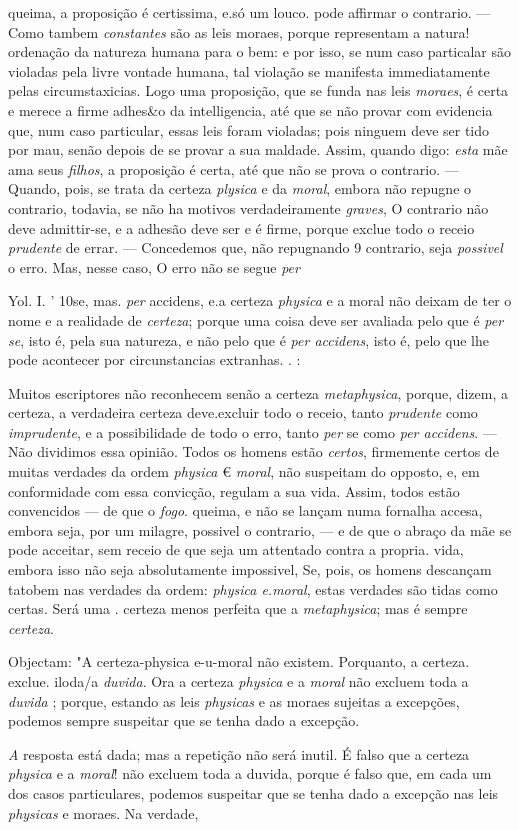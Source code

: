queima, a proposição é certissima, e.só um louco. pode affirmar o contrario. --- Como tambem \emph{constantes} são as leis moraes, porque representam a natura! ordenação da natureza humana para o bem: e por isso, se num caso particalar são violadas pela livre vontade humana, tal violação se manifesta immediatamente pelas circumstaxicias. Logo uma proposição, que se funda nas leis \emph{moraes}, é certa e merece a firme adhes\&o da intelligencia, até que se não provar com evidencia que, num caso particular, essas leis foram violadas; pois ninguem deve ser tido por mau, senão depois de se provar a sua maldade. Assim, quando digo: \emph{esta} mãe ama seus \emph{filhos}, a proposição é certa, até que não se prova o contrario. --- Quando, pois, se trata da certeza \emph{plysica} e da \emph{moral}, embora não repugne o contrario, todavia, se não ha motivos verdadeiramente \emph{graves}, O contrario não deve admittir-se, e a adhesão deve ser e é firme, porque exclue todo o receio \emph{prudente} de errar. --- Concedemos que, não repugnando 9 contrario, seja \emph{possivel} o erro. Mas, nesse caso, O erro não se segue \emph{per}\par Yol. I. ' 10se, mas. \emph{per} accidens, e.a certeza \emph{physica} e a moral não deixam de ter o nome e a realidade de \emph{certeza}; porque uma coisa deve ser avaliada pelo que é \emph{per se}, isto é, pela sua natureza, e não pelo que é \emph{per accidens}, isto é, pelo que lhe pode acontecer por circunstancias extranhas. . :\par Muitos escriptores não reconhecem senão a certeza \emph{metaphysica}, porque, dizem, a certeza, a verdadeira certeza deve.excluir todo o receio, tanto \emph{prudente} como \emph{imprudente}, e a possibilidade de todo o erro, tanto \emph{per} se como \emph{per accidens}. --- Não dividimos essa opinião. Todos os homens estão \emph{certos}, firmemente certos de muitas verdades da ordem \emph{physica} € \emph{moral}, não suspeitam do opposto, e, em conformidade com essa convicção, regulam a sua vida. Assim, todos estão convencidos --- de que o \emph{fogo}. queima, e não se lançam numa fornalha accesa, embora seja, por um milagre, possivel o contrario, --- e de que o abraço da mãe se pode acceitar, sem receio de que seja um attentado contra a propria. vida, embora isso não seja absolutamente impossivel, Se, pois, os homens descançam tatobem nas verdades da ordem: \emph{physica e.moral}, estas verdades são tidas como certas. Será uma . certeza menos perfeita que a \emph{metaphysica}; mas é sempre \emph{certeza}.\par Objectam: "A certeza-physica e-u-moral não existem. Porquanto, a certeza. exclue. iloda/a \emph{duvida}. Ora a certeza \emph{physica} e a \emph{moral} não excluem toda a \emph{duvida} ; porque, estando as leis \emph{physicas} e as moraes sujeitas a excepções, podemos sempre suspeitar que se tenha dado a excepção.\par \emph{A} resposta está dada; mas a repetição não será inutil. É falso que a certeza \emph{physica} e a \emph{moral}! não excluem toda a duvida, porque é falso que, em cada um dos casos particulares, podemos suspeitar que se tenha dado a excepção nas leis \emph{physicas} e moraes. Na verdade, 